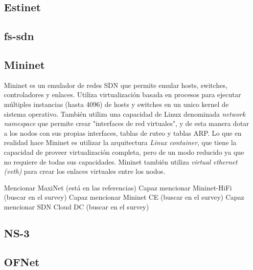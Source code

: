 \subsection{Estinet} %
\subsection{fs-sdn} %
\subsection{Mininet} %
Mininet es un emulador de redes SDN que permite emular hosts, switches, controladores y enlaces. Utiliza virtualización basada en procesos para ejecutar múltiples instancias (hasta 4096) de hosts y switches en un unico kernel de sistema operativo. También utiliza una capacidad de Linux denominada \textit{network namespace} que permite crear "interfaces de red virtuales", y de esta manera dotar a los nodos con sus propias interfaces, tablas de ruteo y tablas ARP. Lo que en realidad hace Mininet es utilizar la arquitectura \textit{Linux container}, que tiene la capacidad de proveer virtualización completa, pero de un modo reducido ya que no requiere de todas sus capacidades. Mininet también utiliza \textit{virtual ethernet (veth)} para crear los enlaces virtuales entre los nodos.

Mencionar MaxiNet (está en las referencias)
Capaz mencionar Mininet-HiFi (buscar en el survey) %
Capaz mencionar Mininet CE (buscar en el survey)
Capaz mencionar SDN Cloud DC (buscar en el survey)
\subsection{NS-3} %
\subsection{OFNet} %

